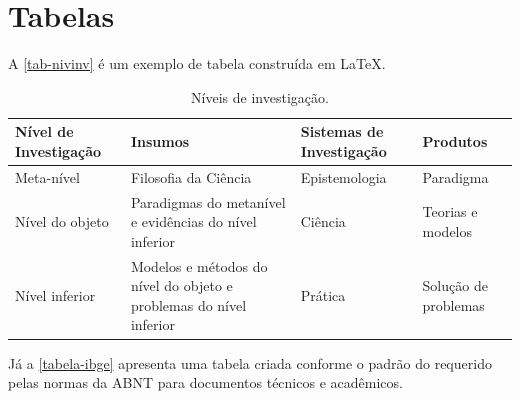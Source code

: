 \section{Tabelas}

A \autoref{tab-nivinv} é um exemplo de tabela construída em
\LaTeX.

\begin{table}[htb]
\ABNTEXfontereduzida
\caption[Níveis de investigação]{Níveis de investigação.}
\label{tab-nivinv}
\begin{tabular}{p{2.6cm}|p{6.0cm}|p{2.25cm}|p{3.40cm}}
   \textbf{Nível de Investigação} & \textbf{Insumos}  & \textbf{Sistemas de Investigação}  & \textbf{Produtos}  \\
    \hline
    Meta-nível & Filosofia\index{filosofia} da Ciência  & Epistemologia &
    Paradigma  \\
    \hline
    Nível do objeto & Paradigmas do metanível e evidências do nível inferior &
    Ciência  & Teorias e modelos \\
    \hline
    Nível inferior & Modelos e métodos do nível do objeto e problemas do nível inferior & Prática & Solução de problemas  \\
\end{tabular}
\end{table}

Já a \autoref{tabela-ibge} apresenta uma tabela criada conforme o padrão do
 requerido pelas normas da ABNT para documentos técnicos e
acadêmicos.

\begin{table}[htb]
\end{table}


